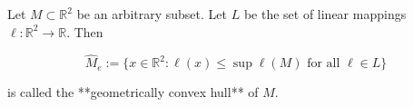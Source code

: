Let $M \subset \mathbb{R}^2$ be an arbitrary subset. Let $L$ be the set of linear mappings $\ell: \mathbb{R}^2 \to \mathbb{R}$. Then

$$\hat{M}_e := \{x \in \mathbb{R}^2 : \ell(x) \leq \sup \ell(M) \text{ for all } \ell \in L\}$$

is called the **geometrically convex hull** of $M$.
